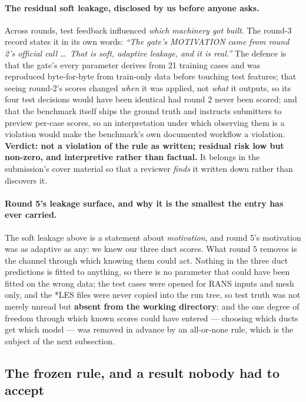 \documentclass[11pt,a4paper]{article}
\newcommand{\breakus}{\textunderscore\allowbreak}
\newcommand{\code}[1]{{\small\ttfamily\let\_\breakus #1}}
\begin{document}
\paragraph{The residual soft leakage, disclosed by us before anyone asks.} Across rounds,
test feedback influenced \emph{which machinery got built}. The round-3 record states it in
its own words: \emph{``The gate's MOTIVATION came from round 2's official call \dots\ That
is soft, adaptive leakage, and it is real.''} The defence is that the gate's every parameter
derives from 21 training cases and was reproduced byte-for-byte from train-only data before
touching test features; that seeing round-2's scores changed \emph{when} it was applied, not
\emph{what} it outputs, so its four test decisions would have been identical had round 2
never been scored; and that the benchmark itself ships the ground truth and instructs
submitters to preview per-case scores, so an interpretation under which observing them is a
violation would make the benchmark's own documented workflow a violation. \textbf{Verdict:
not a violation of the rule as written; residual risk low but non-zero, and interpretive
rather than factual.} It belongs in the submission's cover material so that a reviewer
\emph{finds} it written down rather than discovers it.

\paragraph{Round 5's leakage surface, and why it is the smallest the entry has ever
carried.} The soft leakage above is a statement about \emph{motivation}, and round 5's
motivation was as adaptive as any: we knew our three duct scores. What round 5 removes is
the channel through which knowing them could act. Nothing in the three duct predictions is
fitted to anything, so there is no parameter that could have been fitted on the wrong data;
the test cases were opened for RANS inputs and mesh only, and the \code{*\_LES} files were
never copied into the run tree, so test truth was not merely unread but \textbf{absent from
the working directory}; and the one degree of freedom through which known scores could have
entered --- choosing which ducts get which model --- was removed in advance by an
all-or-none rule, which is the subject of the next subsection.

\subsection{The frozen rule, and a result nobody had to accept}
\label{sec:frozenrule}
\end{document}

